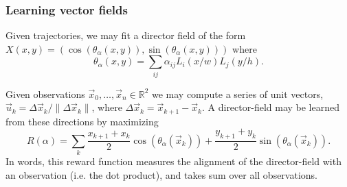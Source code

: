 \documentclass[12pt]{amsart}
\begin{document}
\subsubsection{Learning vector fields}
Given trajectories, we may fit a director field of the form $X(x,y) = ( \cos( \theta_\alpha(x,y) ) , \sin( \theta_\alpha(x,y) ) )$
where 
$$
	\theta_\alpha(x,y) = \sum_{ij} \alpha_{ij} L_i(x / w) L_j(y / h).
$$


Given observations $\vec{x}_0,  \dots, \vec{x}_n \in \mathbb{R}^2$ we may compute a series of unit vectors, $\vec{u}_k = \Delta \vec{x}_k / \| \Delta \vec{x}_k  \|$,
where $\Delta \vec{x}_k = \vec{x}_{k+1} - \vec{x}_k$.
A director-field may be learned from these directions by maximizing
$$
	R(\alpha ) = \sum_{k} \frac{x_{k+1} + x_k}{2} \cos( \theta_\alpha(\vec{x}_k) ) + \frac{y_{k+1} + y_k}{2}  \sin( \theta_\alpha( \vec{x}_k ) ).
$$
In words, this reward function measures the alignment of the director-field with an observation (i.e. the dot product), and takes sum over all observations.



\end{document}
